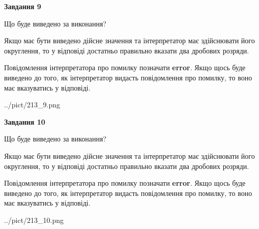 \documentclass[12pt, ukrainian]{article}
\begin{document}
{\begin {Large}
{\begin {center}\textbf{Завдання 9}\end {center}}\par
Що буде виведено за виконання? \par

Якщо має бути виведено дійсне значення та інтерпретатор має здійснювати його округлення, 
то у відповіді достатньо правильно вказати два дробових розряди.

Повідомлення інтерпретатора про помилку позначати \textbf{error}.
Якщо щось буде виведено до того, як інтерпретатор видасть повідомлення про помилку, 
то воно має вказуватись у відповіді. \par

\begin{center}
	{../pict/213_9.png}
\end{center}
\newpage

{\begin {center}\textbf{Завдання 10}\end {center}}\par
Що буде виведено за виконання? \par

Якщо має бути виведено дійсне значення та інтерпретатор має здійснювати його округлення, 
то у відповіді достатньо правильно вказати два дробових розряди.

Повідомлення інтерпретатора про помилку позначати \textbf{error}.
Якщо щось буде виведено до того, як інтерпретатор видасть повідомлення про помилку, 
то воно має вказуватись у відповіді. \par

\begin{center}
	{../pict/213_10.png}
\end{center}
\newpage

\end {Large}}
\end{document}
